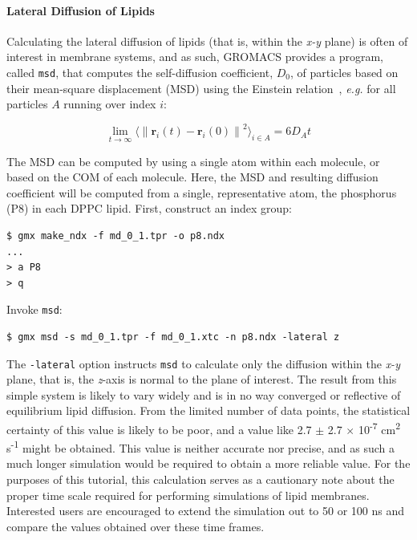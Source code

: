 \documentclass[9pt,tutorial,pubversion]{livecoms}
\newcommand{\norm}[1]{\left\lVert#1\right\rVert}
\begin{document}
\paragraph{Lateral Diffusion of Lipids} \label{kalp_ana_msd}

Calculating the lateral diffusion of lipids (that is, within the {\em x-y} plane) is often of interest in membrane systems, and as such, GROMACS provides a program, called \texttt{msd}, that computes the self-diffusion coefficient, $D_0$, of particles based on their mean-square displacement (MSD) using the Einstein relation~\cite{Allen1987}, {\em e.g.} for all particles $A$ running over index $i$: 

\begin{equation} \label{eq_msd}
\lim_{t\to\infty} \langle \norm{\mathbf{r}_i(t) - \mathbf{r}_i(0)}^2 \rangle_{i \in A} = 6D_{A}t
\end{equation}

The MSD can be computed by using a single atom within each molecule, or based on the COM of each molecule. Here, the MSD and resulting diffusion coefficient will be computed from a single, representative atom, the phosphorus (P8) in each DPPC lipid. First, construct an index group:

\begin{lstlisting}
$ gmx make_ndx -f md_0_1.tpr -o p8.ndx
...
> a P8
> q
\end{lstlisting}

Invoke \texttt{msd}:

\begin{lstlisting}
$ gmx msd -s md_0_1.tpr -f md_0_1.xtc -n p8.ndx -lateral z
\end{lstlisting}
%
The \texttt{-lateral} option instructs \texttt{msd} to calculate only the diffusion within the {\em x-y} plane, that is, the {\em z}-axis is normal to the plane of interest. The result from this simple system is likely to vary widely and is in no way converged or reflective of equilibrium lipid diffusion. From the limited number of data points, the statistical certainty of this value is likely to be poor, and a value like 2.7 $\pm$ 2.7 $\times$ 10\textsuperscript{-7} cm\textsuperscript{2} s\textsuperscript{-1} might be obtained. This value is neither accurate nor precise, and as such a much longer simulation would be required to obtain a more reliable value. For the purposes of this tutorial, this calculation serves as a cautionary note about the proper time scale required for performing simulations of lipid membranes. Interested users are encouraged to extend the simulation out to 50 or 100 ns and compare the values obtained over these time frames.
\end{document}
